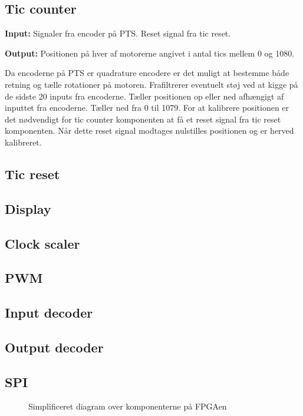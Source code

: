 \subsection*{Tic counter}
\textbf{Input:}
Signaler fra encoder på PTS. Reset signal fra tic reset.

\textbf{Output:} Positionen på hver af motorerne angivet i antal tics mellem 0 
og 1080.

Da encoderne på PTS er quadrature encodere er det muligt at bestemme både retning og 
tælle rotationer på motoren.
Frafiltrerer eventuelt støj ved at kigge på de sidste 20 inputs fra encoderne.
Tæller positionen op eller ned afhængigt af inputtet fra encoderne. 
Tæller ned fra 0 til 1079.
For at kalibrere positionen er det nødvendigt for tic counter komponenten at få 
et reset signal fra tic reset komponenten. 
Når dette reset signal modtages nulstilles positionen og er herved kalibreret.

\subsection*{Tic reset}

\subsection*{Display }

\subsection*{Clock scaler}

\subsection*{PWM}

\subsection*{Input decoder}

\subsection*{Output decoder}

\subsection*{SPI}




\begin{figure}[!th]
\centering
\begin{tikzpicture}[node distance = 5 cm,scale=1]

\end{tikzpicture}
\caption[Kom]{Simplificeret diagram over komponenterne på FPGAen}
\label{fig:FPGA_blok}
\end{figure}


